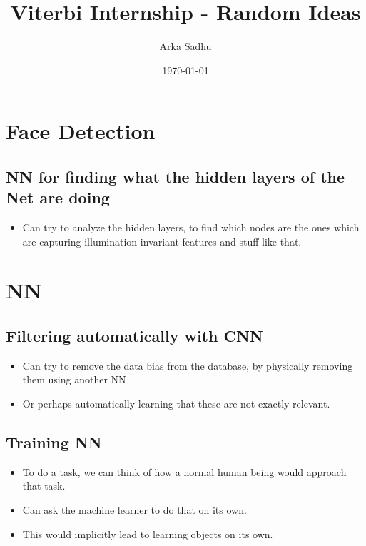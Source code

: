 \documentclass{article}
\title{Viterbi Internship - Random Ideas}
\author{
  Arka Sadhu}
\date{\today}
\begin{document}
\maketitle

\tableofcontents
\newpage
\section{Face Detection}
\subsection{NN for finding what the hidden layers of the Net are doing}
\begin{itemize}
\item Can try to analyze the hidden layers, to find which nodes are the ones which are capturing illumination invariant features and stuff like that.
\end{itemize}

\section{NN}
\subsection{Filtering automatically with CNN}
\begin{itemize}
\item Can try to remove the data bias from the database, by physically removing them using another NN
\item Or perhaps automatically learning that these are not exactly relevant.
\end{itemize}

\subsection{Training NN}
\begin{itemize}
\item To do a task, we can think of how a normal human being would approach that task.
\item Can ask the machine learner to do that on its own.
\item This would implicitly lead to learning objects on its own.
\end{itemize}
\end{document}
